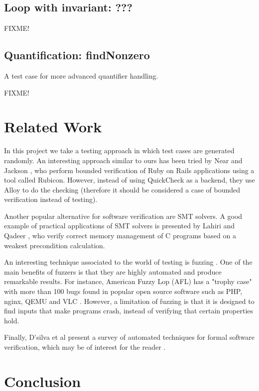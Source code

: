 \documentclass[a4paper]{article}
\begin{document}
\subsection{Loop with invariant: ???}

FIXME!

\subsection{Quantification: findNonzero}

A test case for more advanced quantifier handling.

FIXME!

\section{Related Work}

In this project we take a testing approach in which test cases are generated
randomly. An interesting approach similar to ours has been tried by Near and Jackson
\cite{rubicon}, who perform bounded verification of Ruby on Rails applications
using a tool called Rubicon. However, instead of using QuickCheck as a backend,
they use Alloy to do the checking \cite{alloy} (therefore it should be considered
a case of bounded verification instead of testing).

Another popular alternative for software verification are SMT solvers.
A good example of practical applications of
SMT solvers is presented by Lahiri and Qadeer \cite{Lahiri}, who verify correct
memory management of C programs based on a weakest precondition calculation.

An interesting technique associated to the world of testing is fuzzing \cite{takanen2008fuzzing}.
One of the main benefits of fuzzers is that they are highly automated and
produce remarkable results. For instance, American Fuzzy Lop (AFL) has a "trophy case"
with more than 100 bugs found in popular open source software such as PHP, nginx, QEMU
and VLC \cite{afl}. However, a limitation of fuzzing is that it is designed to find
inputs that make programs crash, instead of verifying that certain properties hold.

Finally, D'silva et al present a survey of automated techniques for formal software
verification, which may be of interest for the reader \cite{d2008survey}.

\section{Conclusion}
\end{document}
